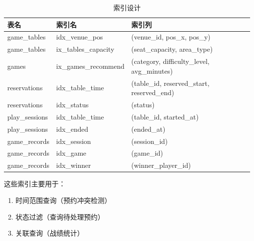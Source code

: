 \begin{table}[H]
  \centering
  \footnotesize
  \caption{索引设计}
  \label{tab:indexes}
  \begin{tabularx}{\textwidth}{|p{2.2cm}|p{4.0cm}|X|}
    \hline
    \textbf{表名} & \textbf{索引名} & \textbf{索引列} \\
    \hline
    game\_tables & idx\_venue\_pos & (venue\_id, pos\_x, pos\_y) \\
    \hline
    game\_tables & ix\_tables\_capacity & (seat\_capacity, area\_type) \\
    \hline
    games & ix\_games\_recommend & (category, difficulty\_level, avg\_minutes) \\
    \hline
    reservations & idx\_table\_time & (table\_id, reserved\_start, reserved\_end) \\
    \hline
    reservations & idx\_status & (status) \\
    \hline
    play\_sessions & idx\_table\_time & (table\_id, started\_at) \\
    \hline
    play\_sessions & idx\_ended & (ended\_at) \\
    \hline
    game\_records & idx\_session & (session\_id) \\
    \hline
    game\_records & idx\_game & (game\_id) \\
    \hline
    game\_records & idx\_winner & (winner\_player\_id) \\
    \hline
  \end{tabularx}
\end{table}

这些索引主要用于：

\begin{enumerate}
  \item 时间范围查询（预约冲突检测）
  \item 状态过滤（查询待处理预约）
  \item 关联查询（战绩统计）
\end{enumerate}
